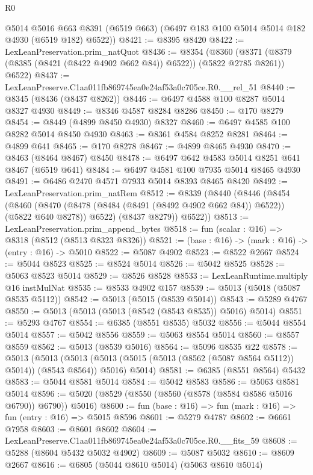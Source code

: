 \begin{lexlean}{R0}
\begin{coremodule}
      @5014
      @5016
      @663
      @8391
      (@6519 @663)
      (@6497 @183 @100 @5014 @5014 @182 @4930 (@6519 @182) @6522))
@8421 := @8395 @8420
@8422 := LexLeanPreservation.prim_natQuot
@8436 := @8354
    (@8360 (@8371 (@8379 (@8385 (@8421 (@8422 @4902 @662 @84)) @6522)) (@5822 @2785 @8261)) @6522)
@8437 := LexLeanPreserve.C1aa011fb869745ea0e24af53a0c705ce.R0.__rel_51
@8440 := @8345 (@8436 (@8437 @8262))
@8446 := @6497 @4588 @100 @8287 @5014 @8327 @4930
@8449 := @8346 @4587 @8284 @8286
@8450 := @170 @8279
@8454 := @8449 (@4899 @8450 @4930) @8327
@8460 := @6497 @4585 @100 @8282 @5014 @8450 @4930
@8463 := @8361 @4584 @8252 @8281
@8464 := @4899 @641
@8465 := @170 @8278
@8467 := @4899 @8465 @4930
@8470 := @8463 (@8464 @8467) @8450
@8478 := @6497 @642 @4583 @5014 @8251 @641 @8467 (@6519 @641)
@8484 := @6497 @4581 @100 @7935 @5014 @8465 @4930
@8491 := @6486 @2470 @4571 @7933 @5014 @8393 @8465 @8420
@8492 := LexLeanPreservation.prim_natRem
@8512 := @8339
    (@8440
      (@8446
        (@8454
          (@8460
            (@8470 (@8478 (@8484 (@8491 (@8492 @4902 @662 @84)) @6522)) (@5822 @640 @8278))
            @6522)
          (@8437 @8279))
        @6522))
@8513 := LexLeanPreservation.prim_append_bytes
@8518 := fun (scalar : @16) => @8318 (@8512 (@8513 @8323 @8326))
@8521 := (base : @16) -> (mark : @16) -> (entry : @16) -> @5010
@8522 := @5087 @4902
@8523 := @8522 @2667
@8524 := @5044 @8523
@8525 := @8524 @5014
@8526 := @5042 @8525
@8528 := @5063 @8523 @5014
@8529 := @8526 @8528
@8533 := LexLeanRuntime.multiply @16 instMulNat
@8535 := @8533 @4902 @157
@8539 := @5013 (@5018 (@5087 @8535 @5112))
@8542 := @5013 (@5015 (@8539 @5014))
@8543 := @5289 @4767
@8550 := @5013 (@5013 (@5013 (@8542 (@8543 @8535)) @5016) @5014)
@8551 := @5293 @4767
@8554 := @6385 (@8551 @8535) @5032
@8556 := @5044 @8554 @5014
@8557 := @5042 @8556
@8559 := @5063 @8554 @5014
@8560 := @8557 @8559
@8562 := @5013 (@8539 @5016)
@8564 := @5096 @8535 @22
@8578 := @5013
    (@5013
      (@5013 (@5013 (@5015 (@5013 (@8562 (@5087 @8564 @5112)) @5014)) (@8543 @8564)) @5016)
      @5014)
@8581 := @6385 (@8551 @8564) @5432
@8583 := @5044 @8581 @5014
@8584 := @5042 @8583
@8586 := @5063 @8581 @5014
@8596 := @5020 (@8529 (@8550 (@8560 (@8578 (@8584 @8586 @5016 @6790)) @6790)) @5016)
@8600 := fun (base : @16) => fun (mark : @16) => fun (entry : @16) => @5015 @8596
@8601 := @5279 @4787
@8602 := @6661 @7958
@8603 := @8601 @8602
@8604 := LexLeanPreserve.C1aa011fb869745ea0e24af53a0c705ce.R0.__fits_59
@8608 := @5288 (@8604 @5432 @5032 @4902)
@8609 := @5087 @5032
@8610 := @8609 @2667
@8616 := @6805 (@5044 @8610 @5014) (@5063 @8610 @5014)

\end{coremodule}
\end{lexlean}
